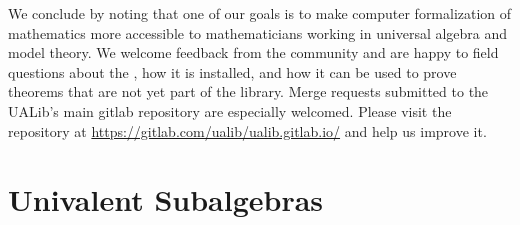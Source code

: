 \documentclass[a4paper,UKenglish,cleveref,autoref,thm-restate,12pt]{../lipics-v2021-wjd}
\begin{document}
We conclude by noting that one of our goals is to make computer formalization of mathematics more accessible to mathematicians working in universal algebra and model theory. We welcome feedback from the community and are happy to field questions about the \ualib, how it is installed, and how it can be used to prove theorems that are not yet part of the library.  Merge requests submitted to the UALib's main gitlab repository are especially welcomed.  Please visit the repository at \url{https://gitlab.com/ualib/ualib.gitlab.io/} and help us improve it.









\appendix


\section{Univalent Subalgebras}\label{sec:univ-subalg}\firstsentence{\ualibUnivalent}{\urlUnivalent}
%









\end{document}

